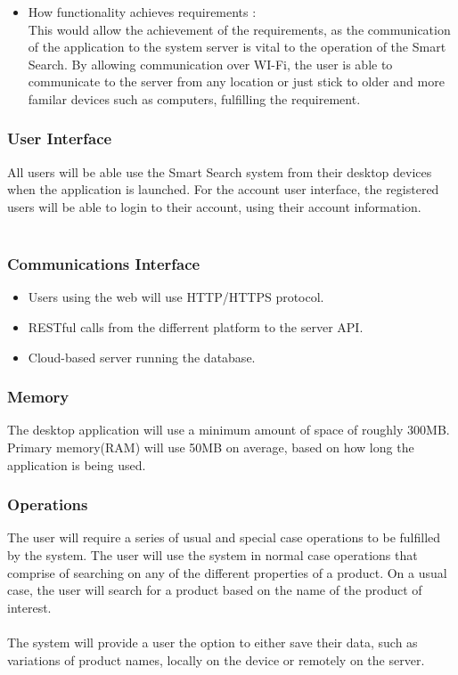 \documentclass[a4paper,10pt]{article}
\begin{document}
{\begin{enumerate}
\begin{itemize}
					\item How functionality achieves requirements :\\
This would allow the achievement of the requirements, as the communication of the application to the system server is vital to the operation of the Smart Search. By allowing communication over WI-Fi, the user is able to communicate to the server from any location  or just stick to older and more familar devices such as computers, fulfilling the requirement.
					\end{itemize}
			\end{enumerate} 
}

		
            \subsubsection{User Interface}
	    All users will be able use the Smart Search system from their desktop devices when the application is launched.
For the account user interface, the registered users will be able to login to their account, using their account information.
\\\\
	    \subsubsection{Communications Interface}
	 \begin{itemize}
	    \item Users using the web will use HTTP/HTTPS protocol.
	    \item RESTful calls from the differrent platform to the server API.
	    \item Cloud-based server running the database.
	    \end{itemize}
	    
            \subsubsection{Memory}
	    {The desktop application will use a minimum amount of space of roughly 300MB.\\
		Primary memory(RAM) will use 50MB on average, based on how long the application is being used.}
		
            \subsubsection{Operations}

            	{The user will require a series of usual and special case operations to be fulfilled by the system. The user will use the system in normal case operations that comprise of searching on any of the different properties of a product. On a usual case, the user will search for a product based on the name of the product of interest.\\\\
            	The system will provide a user the option to either save their data, such as variations of product names, locally on the device or remotely on the server.}
		
\end{document}
